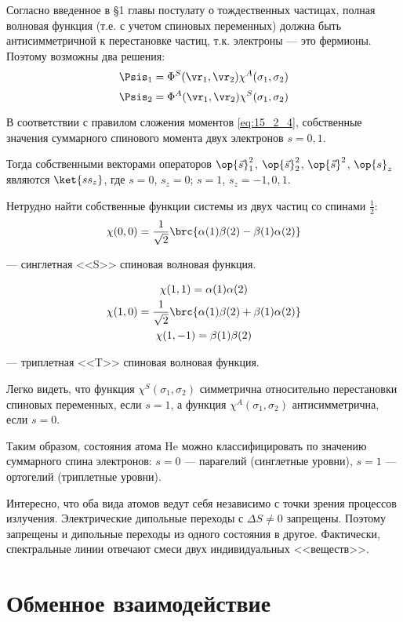 Согласно введенное в \S 1 главы  постулату о тождественных частицах, полная волновая функция (т.е. с учетом спиновых переменных) должна быть антисимметричной к перестановке частиц, т.к. электроны --- это фермионы. Поэтому возможны два решения:
$$
\Psis_1 = \Phi^S(\vr_1, \vr_2) \chi^A(\sigma_1, \sigma_2)
$$
$$
\Psis_2 = \Phi^A(\vr_1, \vr_2) \chi^S(\sigma_1, \sigma_2)
$$

В соответствии с правилом сложения моментов \eqref{eq:15_2_4}, собственные значения суммарного спинового момента двух электронов $s = 0, 1$.

Тогда собственными векторами операторов $\op{\vec{s}}_1^2$, $\op{\vec{s}}_2^2$, $\op{\vec{s}}^2$, $\op{s}_z$ являются $\ket{s s_z}$, где $s = 0$, $s_z = 0$; $s = 1$, $s_z=-1, 0, 1$.

Нетрудно найти собственные функции системы из двух частиц со спинами $\frac{1}{2}$:
$$
\chi(0, 0) = \frac{1}{\sqrt{2}}\brc{\alpha(1)\beta(2) - \beta(1)\alpha(2)}
$$

--- синглетная <<S>> спиновая волновая функция.

\begin{gather*}
\chi(1, 1) = \alpha(1)\alpha(2) \\
\chi(1, 0) = \frac{1}{\sqrt{2}}\brc{\alpha(1)\beta(2) + \beta(1)\alpha(2)} \\
\chi(1, -1) = \beta(1)\beta(2)
\end{gather*}

--- триплетная <<T>> спиновая волновая функция.

Легко видеть, что функция $\chi^S(\sigma_1, \sigma_2)$ симметрична относительно перестановки спиновых переменных, если $s = 1$, а функция $\chi^A(\sigma_1, \sigma_2)$ антисимметрична, если $s = 0$.

Таким образом, состояния атома He можно классифицировать по значению суммарного спина электронов: $s = 0$ --- парагелий (синглетные уровни), $s = 1$ --- ортогелий (триплетные уровни).

Интересно, что оба вида атомов ведут себя независимо с точки зрения процессов излучения. Электрические дипольные переходы с $\Delta S \neq 0$ запрещены. Поэтому запрещены и дипольные переходы из одного состояния в другое. Фактически, спектральные линии отвечают смеси двух индивидуальных <<веществ>>.

\section{Обменное взаимодействие}

